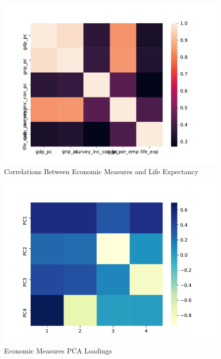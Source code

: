 \documentclass{report}
\begin{document}
	\begin{figure}[h!]
		\centering
		\caption{Correlations Between Economic Measures and Life Expectancy}
		\label{GDP_LE_Correlations_Correlations}	
		\includegraphics[width=\linewidth,keepaspectratio=true]{../Output/Figures/GDP_LE_Correlations.pdf}
	\end{figure}

	\begin{figure}[h!]
		\centering
		\caption{Economic Measures PCA Loadings}
		\label{Econ_Loadings}	
		\includegraphics[width=\linewidth,keepaspectratio=true]{../Output/Figures/GDP_LE_Loadings.pdf}
	\end{figure}
\end{document}
